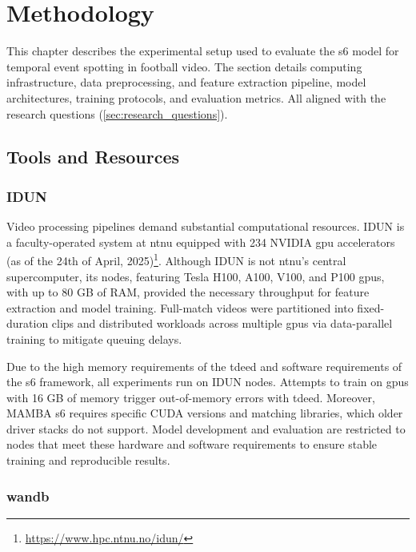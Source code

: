 \chapter{Methodology} 
\label{chap:methodology}
This chapter describes the experimental setup used to evaluate the \acrfull{s6} model for temporal event spotting in football video. The section details computing infrastructure, data preprocessing, and feature extraction pipeline, model architectures, training protocols, and evaluation metrics. All aligned with the research questions (\autoref{sec:research_questions}).


\section{Tools and Resources}
\label{sec:tools_and_resources}

\subsection{IDUN}
\label{ssec:idun}
Video processing pipelines demand substantial computational resources. IDUN is a faculty-operated system at \acrfull{ntnu} equipped with 234 NVIDIA \acrfull{gpu} accelerators (as of the 24th of April, 2025)\footnote{\url{https://www.hpc.ntnu.no/idun/}}. Although IDUN is not \acrshort{ntnu}'s central supercomputer, its nodes, featuring Tesla H100, A100, V100, and P100 \acrshort{gpu}s, with up to 80 GB of RAM, provided the necessary throughput for feature extraction and model training. Full-match videos were partitioned into fixed-duration clips and distributed workloads across multiple \acrshort{gpu}s via data-parallel training to mitigate queuing delays.

Due to the high memory requirements of the \acrfull{tdeed} and software requirements of the \acrfull{s6} framework, all experiments run on IDUN nodes. Attempts to train on \acrshort{gpu}s with 16 GB of memory trigger out-of-memory errors with \acrshort{tdeed}. Moreover, MAMBA \acrshort{s6} requires specific CUDA versions and matching libraries, which older driver stacks do not support. Model development and evaluation are restricted to nodes that meet these hardware and software requirements to ensure stable training and reproducible results. 

\subsection{\acrfull{wandb}}
\label{ssec:wandb}


